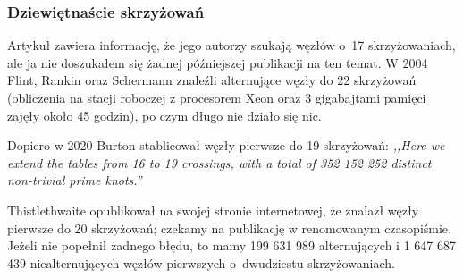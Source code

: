 
\subsubsection{Dziewiętnaście skrzyżowań}
Artykuł \cite{thistlethwaite98} zawiera informację, że jego autorzy szukają węzłów o~17 skrzyżowaniach, ale ja nie doszukałem się żadnej późniejszej publikacji na ten temat.
%
%
%
W 2004 Flint, Rankin oraz Schermann \cite{rankin04} znaleźli alternujące węzły do 22 skrzyżowań (obliczenia na stacji roboczej z procesorem Xeon oraz 3 gigabajtami pamięci zajęły około 45 godzin), po czym długo nie działo się nic.
%
%
%

Dopiero w 2020 Burton \cite{burton20} stablicował węzły pierwsze do 19 skrzyżowań: \emph{,,Here we extend the tables from 16 to 19 crossings, with a total of 352 152 252 distinct non-trivial prime knots.''}
%

Thistlethwaite opublikował na swojej stronie internetowej, że znalazł węzły pierwsze do 20 skrzyżowań; czekamy na publikację w renomowanym czasopiśmie.
Jeżeli nie popełnił żadnego błędu, to mamy 199 631 989 alternujących i 1 647 687 439 niealternujących węzłów pierwszych o~dwudziestu skrzyżowaniach.
%

